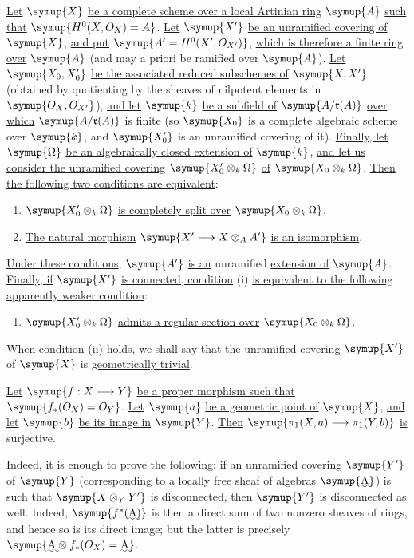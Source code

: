  \uline{Let} $\symup{X}$ \uline{be a complete scheme over a local Artinian ring} $\symup{A}$
\uline{such that} $\symup{H^0(X,O_X)=A}$. \uline{Let} $\symup{X'}$ \uline{be an unramified covering of} $\symup{X}$, \uline{and
put} $\symup{A'=H^0(X',O_{X'})}$, \uline{which is therefore a finite ring over} $\symup{A}$ (and may
a priori be ramified over $\symup{A}$). \uline{Let} $\symup{X_0,X'_0}$ \uline{be the associated
reduced subschemes of} $\symup{X,X'}$ (obtained by quotienting by the sheaves of
nilpotent elements in $\symup{O_X,O_{X'}}$), \uline{and let} $\symup{k}$ \uline{be a subfield of}
$\symup{A/\mathfrak r(A)}$ \uline{over which} $\symup{A/\mathfrak r(A)}$ is finite (so $\symup{X_0}$ is a
complete algebraic scheme over $\symup{k}$, and $\symup{X'_0}$ is an unramified covering of
it). \uline{Finally, let} $\symup{\Omega}$ \uline{be an algebraically closed extension of} $\symup{k}$, \uline{and
let us consider the unramified covering} $\symup{X'_0\otimes_k\Omega}$ \uline{of}
$\symup{X_0\otimes_k\Omega}$. \uline{Then the following two conditions are equivalent}:
\begin{enumerate}
  \item[i.] $\symup{X'_0\otimes_k\Omega}$ \uline{is completely split over}
    $\symup{X_0\otimes_k\Omega}$.
  \item[ii.] \uline{The natural morphism}
    $\symup{X'\longrightarrow X\otimes_A A'}$ \uline{is an isomorphism}.
\end{enumerate}
\uline{Under these conditions}, $\symup{A'}$ \uline{is an} unramified \uline{extension of} $\symup{A}$. \uline{Finally, if}
$\symup{X'}$ \uline{is connected, condition} (i) \uline{is equivalent to the following
apparently weaker condition}:
\begin{enumerate}
  \item[i. bis] $\symup{X'_0\otimes_k\Omega}$ \uline{admits a regular section over}
    $\symup{X_0\otimes_k\Omega}$.
\end{enumerate}
When condition (ii) holds, we shall say that the unramified covering
$\symup{X'}$ of $\symup{X}$ is \uline{geometrically trivial}.


 \uline{Let} $\symup{f:X\longrightarrow Y}$ \uline{be a proper morphism such that}
$\symup{f_*(O_X)=O_Y}$. \uline{Let} $\symup{a}$ \uline{be a geometric point of} $\symup{X}$, \uline{and let} $\symup{b}$ \uline{be its
image in} $\symup{Y}$. \uline{Then} $\symup{\pi_1(X,a)\longrightarrow\pi_1(Y,b)}$ \uline{is} surjective.

Indeed, it is enough to prove the following: if an unramified covering $\symup{Y'}$ of
$\symup{Y}$ (corresponding to a locally free sheaf of algebras $\symup{\text{\uwave{A}}}$) is such
that $\symup{X\otimes_Y Y'}$ is disconnected, then $\symup{Y'}$ is disconnected as well.
Indeed, $\symup{f^*(\text{\uwave{A}})}$ is then a direct sum of two nonzero sheaves of rings,
and hence so is its direct image; but the latter is precisely
$\symup{\text{\uwave{A}}\otimes f_*(O_X)=\text{\uwave{A}}}$.

